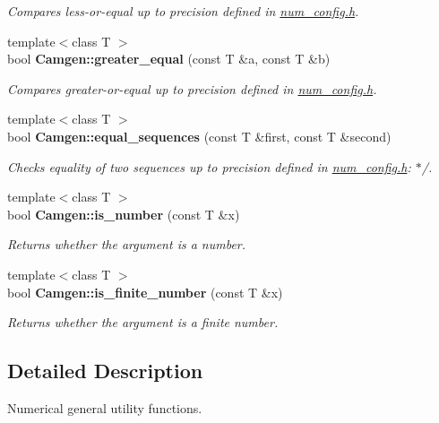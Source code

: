 \begin{DoxyCompactItemize}
\begin{DoxyCompactList}\small\item\em Compares less-\/or-\/equal up to precision defined in \hyperlink{a00702}{num\+\_\+config.\+h}. \end{DoxyCompactList}\item 
\hypertarget{a00878_abee2ae5bcff2561082cab2e246a56b68}{}{\footnotesize template$<$class T $>$ }\\bool {\bfseries Camgen\+::greater\+\_\+equal} (const T \&a, const T \&b)\label{a00878_abee2ae5bcff2561082cab2e246a56b68}

\begin{DoxyCompactList}\small\item\em Compares greater-\/or-\/equal up to precision defined in \hyperlink{a00702}{num\+\_\+config.\+h}. \end{DoxyCompactList}\item 
\hypertarget{a00878_aff6dfdb392a7c17fcf72cdf9b09fbde8}{}{\footnotesize template$<$class T $>$ }\\bool {\bfseries Camgen\+::equal\+\_\+sequences} (const T \&first, const T \&second)\label{a00878_aff6dfdb392a7c17fcf72cdf9b09fbde8}

\begin{DoxyCompactList}\small\item\em Checks equality of two sequences up to precision defined in \hyperlink{a00702}{num\+\_\+config.\+h}\+: $\ast$/. \end{DoxyCompactList}\item 
\hypertarget{a00878_a7218c01b067ffdd687daf7af70c4338a}{}{\footnotesize template$<$class T $>$ }\\bool {\bfseries Camgen\+::is\+\_\+number} (const T \&x)\label{a00878_a7218c01b067ffdd687daf7af70c4338a}

\begin{DoxyCompactList}\small\item\em Returns whether the argument is a number. \end{DoxyCompactList}\item 
\hypertarget{a00878_a6b33d96423eb36664c6878e8d42f2a2d}{}{\footnotesize template$<$class T $>$ }\\bool {\bfseries Camgen\+::is\+\_\+finite\+\_\+number} (const T \&x)\label{a00878_a6b33d96423eb36664c6878e8d42f2a2d}

\begin{DoxyCompactList}\small\item\em Returns whether the argument is a finite number. \end{DoxyCompactList}\end{DoxyCompactItemize}


\subsection{Detailed Description}
Numerical general utility functions. 


